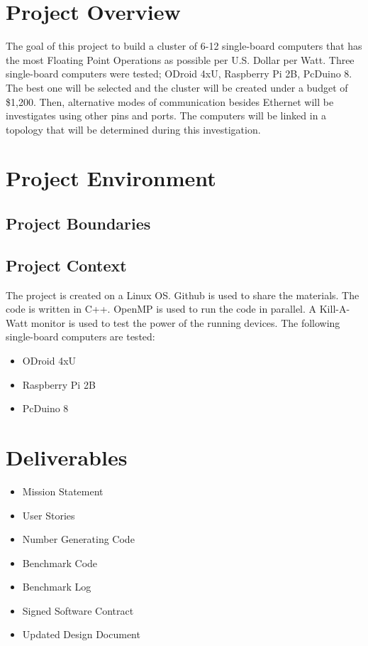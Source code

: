 \documentclass{article}
\begin{document}
\section*{Project Overview}
The goal of this project to build a cluster of 6-12 single-board computers that has the most Floating Point Operations as possible per U.S. Dollar per Watt. Three single-board computers were tested; ODroid 4xU, Raspberry Pi 2B, PcDuino 8. The best one will be selected and the cluster will be created under a budget of \$1,200. Then, alternative modes of communication besides Ethernet will be investigates using other pins and ports. The computers will be linked in a topology that will be determined during this investigation.

\section*{Project Environment}
\subsection*{Project Boundaries}
\subsection*{Project Context}
The project is created on a Linux OS. Github is used to share the materials. The code is written in C++. OpenMP is used to run the code in parallel. A Kill-A-Watt monitor is used to test the power of the running devices.
\newline \newline The following single-board computers are tested:
\begin{itemize}
	\item ODroid 4xU
	\item Raspberry Pi 2B
	\item PcDuino 8
\end{itemize} 

\section*{Deliverables}
\begin{itemize}
	\item Mission Statement
	\item User Stories
	\item Number Generating Code
	\item Benchmark Code
	\item Benchmark Log
	\item Signed Software Contract
	\item Updated Design Document
\end{itemize}
\end{document}
